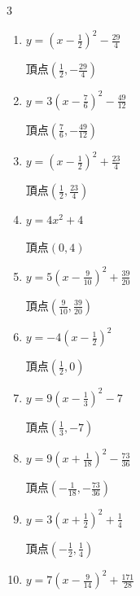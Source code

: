 \begin{multicols}{3}
\begin{enumerate}
        $\displaystyle 頂点\left( \frac{5}{8} , -\frac{153}{16} \right)$

  \item $\displaystyle y=\left( x-\frac{1}{2}\right)^{2}-\frac{29}{4}$

        $\displaystyle 頂点\left( \frac{1}{2} , -\frac{29}{4} \right)$

  \item $\displaystyle y=3\left( x-\frac{7}{6}\right)^{2}-\frac{49}{12}$

        $\displaystyle 頂点\left( \frac{7}{6} , -\frac{49}{12} \right)$

  \item $\displaystyle y=\left( x-\frac{1}{2}\right)^{2}+\frac{23}{4}$

        $\displaystyle 頂点\left( \frac{1}{2} , \frac{23}{4} \right)$

  \item $\displaystyle y=4x^{2}+4$

        $\displaystyle 頂点\left( 0 , 4 \right)$

  \item $\displaystyle y=5\left( x-\frac{9}{10}\right)^{2}+\frac{39}{20}$

        $\displaystyle 頂点\left( \frac{9}{10} , \frac{39}{20} \right)$

  \item $\displaystyle y=-4\left( x-\frac{1}{2}\right)^{2}$

        $\displaystyle 頂点\left( \frac{1}{2} , 0 \right)$

  \item $\displaystyle y=9\left( x-\frac{1}{3}\right)^{2}-7$

        $\displaystyle 頂点\left( \frac{1}{3} , -7 \right)$

\columnbreak %

  \item $\displaystyle y=9\left( x+\frac{1}{18}\right)^{2}-\frac{73}{36}$

        $\displaystyle 頂点\left( -\frac{1}{18} , -\frac{73}{36} \right)$

  \item $\displaystyle y=3\left( x+\frac{1}{2}\right)^{2}+\frac{1}{4}$

        $\displaystyle 頂点\left( -\frac{1}{2} , \frac{1}{4} \right)$

  \item $\displaystyle y=7\left( x-\frac{9}{14}\right)^{2}+\frac{171}{28}$


\end{enumerate}
\end{multicols}
